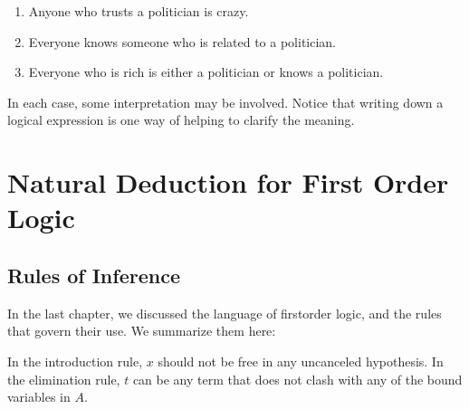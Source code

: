 \documentclass[letterpaper,10pt,english]{sphinxmanual}
\begin{document}
\begin{enumerate}
\begin{enumerate}
\item {} 
\sphinxAtStartPar
Anyone who trusts a politician is crazy.

\item {} 
\sphinxAtStartPar
Everyone knows someone who is related to a politician.

\item {} 
\sphinxAtStartPar
Everyone who is rich is either a politician or knows a politician.

\end{enumerate}

\sphinxAtStartPar
In each case, some interpretation may be involved. Notice that writing down a logical expression is one way of helping to clarify the meaning.

\end{enumerate}


\chapter{Natural Deduction for First Order Logic}
\label{\detokenize{natural_deduction_for_first_order_logic:natural-deduction-for-first-order-logic}}\label{\detokenize{natural_deduction_for_first_order_logic::doc}}

\section{Rules of Inference}
\label{\detokenize{natural_deduction_for_first_order_logic:rules-of-inference}}
\sphinxAtStartPar
In the last chapter, we discussed the language of first\sphinxhyphen{}order logic, and the rules that govern their use. We summarize them here:

\sphinxAtStartPar
{}



\begin{quote}
\DP
\quad\quad
{}
\DP
\end{quote}

\sphinxAtStartPar
In the introduction rule, \(x\) should not be free in any uncanceled hypothesis. In the elimination rule, \(t\) can be any term that does not clash with any of the bound variables in \(A\).

\sphinxAtStartPar
{}
\end{document}
